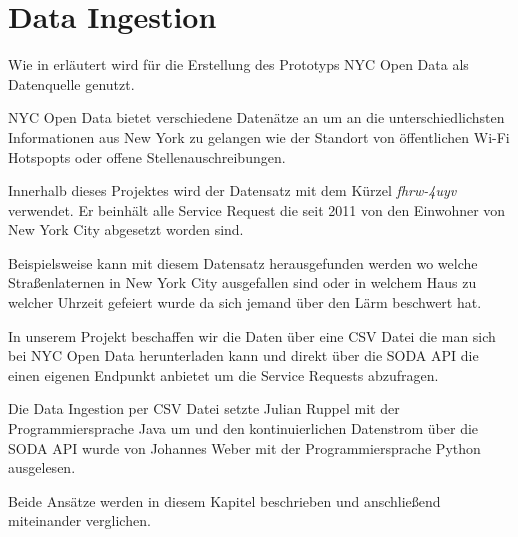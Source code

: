 \section{Data Ingestion}

Wie in  erläutert wird für die Erstellung des Prototyps NYC Open Data als Datenquelle genutzt.

NYC Open Data bietet verschiedene Datenätze an um an die unterschiedlichsten Informationen aus New York zu gelangen
wie \zb{} der Standort von öffentlichen Wi-Fi Hotspopts oder offene Stellenauschreibungen.\autocite{NYCOpenDataExample}

Innerhalb dieses Projektes wird der Datensatz mit dem Kürzel \textit{fhrw-4uyv} verwendet.
Er beinhält alle Service Request die seit 2011 von den Einwohner von New York City abgesetzt worden sind.

Beispielsweise kann mit diesem Datensatz herausgefunden werden wo welche Straßenlaternen in New York City ausgefallen sind
oder in welchem Haus zu welcher Uhrzeit gefeiert wurde da sich jemand über den Lärm beschwert hat.

In unserem Projekt beschaffen wir die Daten über eine \ac{CSV} Datei die man sich bei NYC Open Data herunterladen kann
und direkt über die \ac{SODA} \ac{API} die einen eigenen Endpunkt anbietet um die Service Requests abzufragen.

Die Data Ingestion per \ac{CSV} Datei setzte Julian Ruppel mit der Programmiersprache Java um und
den kontinuierlichen Datenstrom über die \ac{SODA} \ac{API} wurde von Johannes Weber mit der Programmiersprache Python
ausgelesen.

Beide Ansätze werden in diesem Kapitel beschrieben und anschließend miteinander verglichen.



